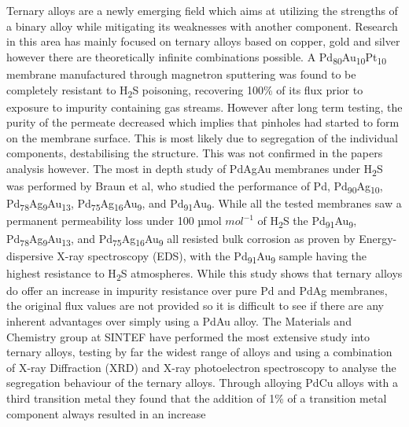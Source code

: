 Ternary alloys are a newly emerging field which aims at utilizing the strengths of a binary 
alloy while mitigating its weaknesses with another component. Research in this area has 
mainly focused on ternary alloys based on copper, gold and silver however there are 
theoretically infinite combinations possible. 
A Pd\textsubscript{80}Au\textsubscript{10}Pt\textsubscript{10} membrane manufactured through 
magnetron sputtering was found to be completely resistant to H\textsubscript{2}S poisoning, 
recovering 100\% of its flux prior to exposure to impurity containing gas streams. \cite{Coulter2012} 
However after long term testing, the purity of the permeate decreased which implies that 
pinholes had started to form on the membrane surface. \cite{Coulter2012} This is most likely due to 
segregation of the individual components, destabilising the structure. This was not 
confirmed in the papers analysis however. \cite{Coulter2012} The most in depth study of PdAgAu membranes 
under H\textsubscript{2}S was performed by Braun et al, who studied the performance of Pd, 
Pd\textsubscript{90}Ag\textsubscript{10}, Pd\textsubscript{78}Ag\textsubscript{9}Au\textsubscript{13}, 
Pd\textsubscript{75}Ag\textsubscript{16}Au\textsubscript{9}, and Pd\textsubscript{91}Au\textsubscript{9}. 
While all the tested membranes saw a permanent permeability loss under 100 µmol $mol^{-1}$ 
of H\textsubscript{2}S the Pd\textsubscript{91}Au\textsubscript{9}, Pd\textsubscript{78}Ag\textsubscript{9}Au\textsubscript{13}, 
and Pd\textsubscript{75}Ag\textsubscript{16}Au\textsubscript{9} all resisted bulk corrosion 
as proven by Energy-dispersive X-ray spectroscopy (EDS), with the Pd\textsubscript{91}Au\textsubscript{9} 
sample having the highest resistance to H\textsubscript{2}S atmospheres. \cite{Braun2012, Braun2014a} While this 
study shows that ternary alloys do offer an increase in impurity resistance over pure Pd and 
PdAg membranes, the original flux values are not provided so it is difficult to see if 
there are any inherent advantages over simply using a PdAu alloy. \cite{Braun2012, Braun2014a} The Materials 
and Chemistry group at SINTEF have performed the most extensive study into ternary 
alloys, \cite{Peters2011, Peters2013} testing by far the widest range of alloys and using a combination  of X-ray 
Diffraction (XRD) and X-ray photoelectron spectroscopy to analyse the segregation behaviour 
of the ternary alloys. \cite{Peters2011, Peters2013} Through alloying PdCu alloys with a third transition metal they 
found that the addition of 1\% of a transition metal component always resulted in an increase 
